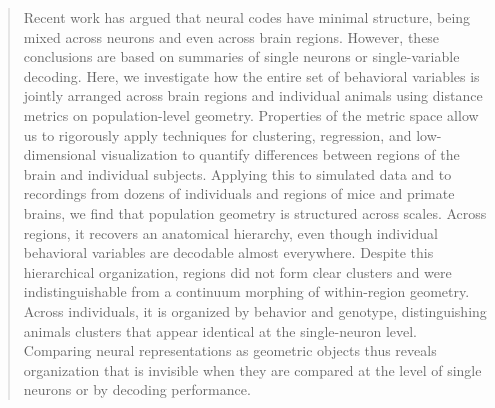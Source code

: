 \begin{abstract}
\noindent
Recent work has argued that neural codes have minimal structure, being mixed across neurons and even across brain regions. However, these conclusions are based on summaries of single neurons or single-variable decoding. Here, we investigate how the entire set of behavioral variables is jointly arranged across brain regions and individual animals using distance metrics on population-level geometry. Properties of the metric space allow us to rigorously apply techniques for clustering, regression, and low-dimensional visualization to quantify differences between regions of the brain and individual subjects.
Applying this to simulated data and to recordings from dozens of individuals and regions of mice and primate brains, we find that population geometry is structured across scales. Across regions, it recovers an anatomical hierarchy, even though individual behavioral variables are decodable almost everywhere. Despite this hierarchical organization, regions did not form clear clusters and were indistinguishable from a continuum morphing of within-region geometry. Across individuals, it is organized by behavior and genotype, distinguishing animals clusters that appear identical at the single-neuron level. Comparing neural representations as geometric objects thus reveals organization that is invisible when they are compared at the level of single neurons or by decoding performance.

\end{abstract}